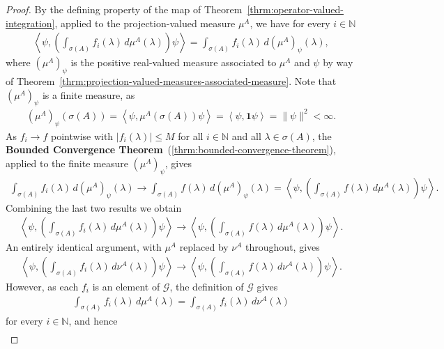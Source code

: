 \begin{proof}
By the defining property of the map of Theorem~\ref{thrm:operator-valued-integration}, applied to the projection-valued measure $\mu^A$, we have for every $i \in \mathbb{N}$
\begin{align}
    \left< \psi, \left( \int_{\sigma(A)} f_i(\lambda) \, d\mu^A(\lambda) \right) \psi \right> = \int_{\sigma(A)} f_i(\lambda) \, d(\mu^A)_\psi(\lambda),
\end{align}
where $(\mu^A)_\psi$ is the positive real-valued measure associated to $\mu^A$ and $\psi$ by way of Theorem~\ref{thrm:projection-valued-measures-associated-measure}. Note that $(\mu^A)_\psi$ is a finite measure, as
\begin{align}
    (\mu^A)_\psi(\sigma(A)) = \left< \psi, \mu^A(\sigma(A)) \psi \right> = \left< \psi, \mathbf{1} \psi \right> = \|\psi\|^2 < \infty.
\end{align}
As $f_i \rightarrow f$ pointwise with $\lvert f_i(\lambda) \rvert \le M$ for all $i \in \mathbb{N}$ and all $\lambda \in \sigma(A)$, the \textbf{Bounded Convergence Theorem}~(\ref{thrm:bounded-convergence-theorem}), applied to the finite measure $(\mu^A)_\psi$, gives
\begin{align}
    \int_{\sigma(A)} f_i(\lambda) \, d(\mu^A)_\psi(\lambda) \longrightarrow \int_{\sigma(A)} f(\lambda) \, d(\mu^A)_\psi(\lambda) = \left< \psi, \left( \int_{\sigma(A)} f(\lambda) \, d\mu^A(\lambda) \right) \psi \right>.
\end{align}
Combining the last two results we obtain
\begin{align}
    \left< \psi, \left( \int_{\sigma(A)} f_i(\lambda) \, d\mu^A(\lambda) \right) \psi \right> \longrightarrow \left< \psi, \left( \int_{\sigma(A)} f(\lambda) \, d\mu^A(\lambda) \right) \psi \right>.
\end{align}
An entirely identical argument, with $\mu^A$ replaced by $\nu^A$ throughout, gives
\begin{align}
    \left< \psi, \left( \int_{\sigma(A)} f_i(\lambda) \, d\nu^A(\lambda) \right) \psi \right> \longrightarrow \left< \psi, \left( \int_{\sigma(A)} f(\lambda) \, d\nu^A(\lambda) \right) \psi \right>.
\end{align}
However, as each $f_i$ is an element of $\mathcal{G}$, the definition of $\mathcal{G}$ gives
\begin{align}
    \int_{\sigma(A)} f_i(\lambda) \, d\mu^A(\lambda) = \int_{\sigma(A)} f_i(\lambda) \, d\nu^A(\lambda)
\end{align}
for every $i \in \mathbb{N}$, and hence
\begin{align}

\end{align}
\end{proof}
